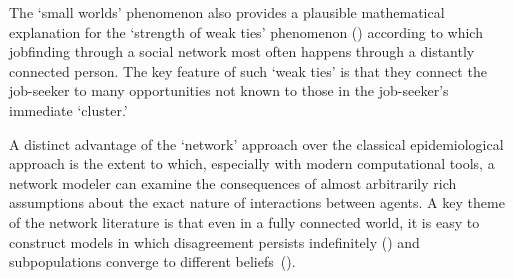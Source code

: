 The `small worlds' phenomenon also provides a plausible mathematical explanation for the `strength of weak ties' phenomenon (\cite{granovetter1973strength}) according to which jobfinding through a social network most often happens through a distantly connected person.  The key feature of such `weak ties' is that they connect the job-seeker to many opportunities not known to those in the job-seeker's immediate `cluster.'







A distinct advantage of the `network' approach over the classical epidemiological approach is the extent to which, especially with modern computational tools, a network modeler can examine the consequences of almost arbitrarily rich assumptions about the exact nature of interactions between agents.  A key theme of the network literature is that even in a fully connected world, it is easy to construct models in which disagreement persists indefinitely (\cite{acemouglu2013opinion}) and subpopulations converge to different beliefs~(\cite{sikder2020minimalistic}).%

